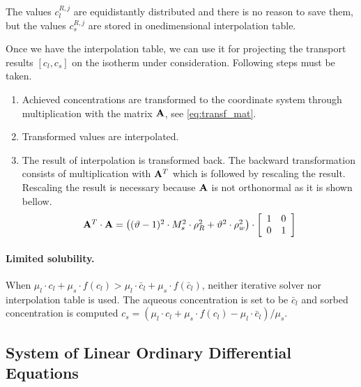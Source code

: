 The values $c_l^{R,j}$ are equidistantly distributed and there is no reason to save them, but the values 
$c_s^{R,j}$ are stored in onedimensional interpolation table.

Once we have the interpolation table, we can use it for projecting the transport results ${[c_l,c_s]}$ on the 
isotherm under consideration. Following steps must be taken.
\begin{enumerate}
 \item Achieved concentrations are transformed to the coordinate system through multiplication with the 
       matrix ${\bf A}$, see \eqref{eq:transf_mat}.
 \item Transformed values are interpolated.
 \item The result of interpolation is transformed back. The backward transformation consists of multiplication 
       with ${\bf A}^T$ which is followed by rescaling the result. Rescaling the result is necessary because  
       ${\bf A}$ is not orthonormal as it is shown bellow.
 \[
 \begin{array}{l}
 {\bf A}^T\cdot{\bf A} =
  \left((\vartheta - 1)^2\cdot M_s^2\cdot \rho_R^2 + \vartheta^2\cdot \rho_w^2\right)\cdot\left[\begin{array}{cc}
    1 & 0\\
    0 & 1
  \end{array}\right]
  \end{array}
 \]
\end{enumerate}


\paragraph{Limited solubility.} When $\mu_l\cdot c_l + \mu_s\cdot f(c_l) > \mu_l\cdot \bar{c}_l + \mu_s\cdot f(\bar{c}_l)$, neither iterative 
solver nor interpolation table is used. The aqueous concentration is set to be $\bar{c}_l$ and sorbed 
concentration is computed $c_s = (\mu_l\cdot c_l + \mu_s\cdot f(c_l) - \mu_l\cdot \bar{c}_l)/\mu_s$.

\subsection{System of Linear Ordinary Differential Equations}
\label{sec:num_slode}

